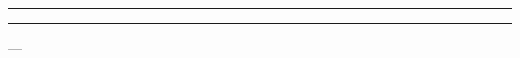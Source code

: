 \documentclass[../thesis.tex]{subfiles}
\begin{document}
\begin{center}
\begin{minipage}{0.5\textwidth}
\begin{center}
            \noindent\supervisor
            
            \noindent\rule{6cm}{0.4pt}
            
            \noindent{}
            
             \rule{6cm}{0.4pt}
            
            \noindent{}
        \end{center}
    \end{minipage}

\vfill

    \noindent\place{} --- \the\year{}

\end{center}
\end{document}
